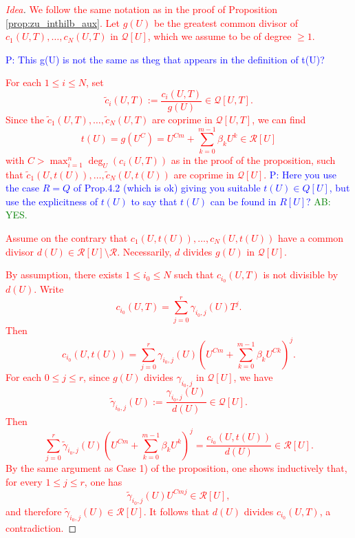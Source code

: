\documentclass[11pt,a4paper,reqno]{amsart}
\theoremstyle{definition}
\begin{document}
\begin{proof}[\textcolor{red}{Idea}]
\textcolor{red}{We follow the same notation as in the proof of Proposition \ref{prop:zu_inthilb_aux}. Let $g(U)$ be the greatest common divisor of $c_1(U,T),\dots,c_N(U,T)$ in $\mathcal{Q}[U]$, which we assume to be of degree $\geq 1$.}

\textcolor{blue}{P: This g(U) is not the same as theg that appears in the definition of t(U)?}

\textcolor{red}{For each $1 \leq i \leq N$, set
$$
\tilde{c}_i(U,T):=\frac{c_i(U,T)}{g(U)} \in \mathcal{Q}[U,T].
$$
Since the $\tilde c_1(U,T),\dots,\tilde c_N(U,T)$ are coprime in $\mathcal{Q}[U,T]$, we can find 
$$t(U)=g(U^C)=U^{Cm}+\sum_{k=0}^{m-1} \beta_k U^k \in \mathcal{R}[U]
$$ with $C>\max_{i=1}^n \deg_U(c_i(U,T))$ as in the proof of the proposition, such that $\tilde c_1(U,t(U)),\dots,\tilde c_N(U,t(U))$ are coprime in $\mathcal{Q}[U]$.}
\textcolor{blue}{P: Here you use the case $R=Q$ of Prop.4.2 (which is ok) giving you suitable $t(U) \in Q[U]$, but use the explicitness of $t(U)$ to say that $t(U)$ can be found in $R[U]$?} \textcolor{green}{AB: YES.}

\textcolor{red}{Assume on the contrary that $c_1(U,t(U)),\dots,c_N(U,t(U))$ have a common divisor $d(U) \in \mathcal{R}[U] \setminus \mathcal{R}$. Necessarily, $d$ divides $g(U)$ in $\mathcal{Q}[U]$.} 

\textcolor{red}{By assumption, there exists $1 \leq i_0 \leq N$ such that $c_{i_0}(U,T)$ is not divisible by $d(U)$.
Write
$$
c_{i_0}(U,T)=\sum_{j=0}^{r}\gamma_{i_0,j}(U)T^j.
$$
Then
$$
c_{i_0}(U,t(U))=\sum_{j=0}^{r} \gamma_{i_0,j}(U)\left( U^{Cm}+\sum_{k=0}^{m-1} \beta_k U^{Ck}\right)^j.
$$
For each $0 \leq j \leq r$, since $g(U)$ divides $\gamma_{i_0,j}$ in $\mathcal{Q}[U]$, we have 
$$
\tilde{\gamma}_{i_0,j}(U):=\frac{\gamma_{i_0,j}(U)}{d(U)} \in \mathcal{Q}[U].
$$
Then
$$
\sum_{j=0}^r \tilde{\gamma}_{i_0,j}(U)\left( U^{Cm}+\sum_{k=0}^{m-1} \beta_k U^k\right)^j=\frac{c_{i_0}(U,t(U))}{d(U)} \in \mathcal{R}[U].
$$ By the same argument as Case 1) of the proposition, one shows inductively that, for every $1 \leq j \leq r$, one has 
$$\tilde{\gamma}_{i_0,j}(U) U^{Cmj} \in \mathcal{R}[U],
$$ and therefore $\tilde{\gamma}_{i_0,j}(U) \in \mathcal{R}[U]$. It follows that $d(U)$ divides $c_{i_0}(U,T)$, a contradiction.}

\end{proof}
\end{document}
